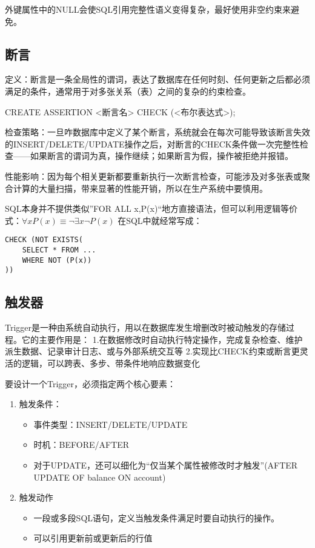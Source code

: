 外键属性中的NULL会使SQL引用完整性语义变得复杂，最好使用非空约束来避免。

\subsection{断言}

定义：断言是一条全局性的谓词，表达了数据库在任何时刻、任何更新之后都必须满足的条件，通常用于对多张关系（表）之间的复杂的约束检查。

CREATE ASSERTION <断言名> CHECK (<布尔表达式>);

检查策略：一旦咋数据库中定义了某个断言，系统就会在每次可能导致该断言失效的INSERT/DELETE/UPDATE操作之后，对断言的CHECK条件做一次完整性检查——如果断言的谓词为真，操作继续；如果断言为假，操作被拒绝并报错。

性能影响：因为每个相关更新都要重新执行一次断言检查，可能涉及对多张表或聚合计算的大量扫描，带来显著的性能开销，所以在生产系统中要慎用。

SQL本身并不提供类似”FOR ALL x,P(x)“地方直接语法，但可以利用逻辑等价式：$\forall x P(x)\equiv \lnot \exists x\lnot P(x)$
在SQL中就经常写成：
\begin{lstlisting}[style=sqlstyle]
CHECK (NOT EXISTS(
    SELECT * FROM ...
    WHERE NOT (P(x))
))    
\end{lstlisting}

\subsection{触发器}

Trigger是一种由系统自动执行，用以在数据库发生增删改时被动触发的存储过程。它的主要作用是：
1.在数据修改时自动执行特定操作，完成复杂检查、维护派生数据、记录审计日志、或与外部系统交互等
2.实现比CHECK约束或断言更灵活的逻辑，可以跨表、多步、带条件地响应数据变化

要设计一个Trigger，必须指定两个核心要素：
\begin{enumerate}
    \item 触发条件：
       \begin{itemize}
          \item 事件类型：INSERT/DELETE/UPDATE
          \item 时机：BEFORE/AFTER
          \item 对于UPDATE，还可以细化为“仅当某个属性被修改时才触发”(AFTER UPDATE OF balance ON account)
       \end{itemize}
    \item 触发动作
       \begin{itemize}
          \item 一段或多段SQL语句，定义当触发条件满足时要自动执行的操作。
          \item 可以引用更新前或更新后的行值
       \end{itemize}
\end{enumerate}


